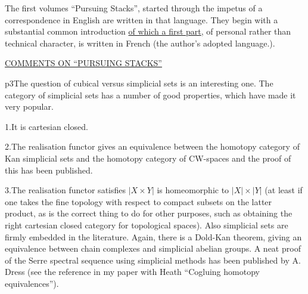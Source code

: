 The  first  volumes ``Pursuing Stacks'', started\textendash{} through the impetus of a correspondence in English are written in that language. They begin with a substantial common introduction \uline{of which a first part}, of personal rather than technical character, is written in French (the author's adopted language.).

\begin{center}\uline{COMMENTS ON ``PURSUING STACKS''}\end{center}


p3\qquad The question of cubical versus simplicial sets is an interesting one. The category of simplicial sets has a number of good properties, which have made it very popular.

1.\quad It is cartesian closed.

2.\quad The realisation functor gives an equivalence between the homotopy category of Kan simplicial sets and the homotopy category of CW-spaces and the proof of this has been published.

3.\quad The realisation functor satisfies $\lvert X\times Y\rvert$ is homeomorphic to $\lvert X\rvert\times\lvert Y\rvert$ (at least if one takes the fine topology with respect to compact subsets on the latter product, as is the correct thing to do for other purposes, such as obtaining the right cartesian closed category for topological spaces). Also simplicial sets are firmly embedded in the literature. Again, there is a Dold-Kan theorem, giving an equivalence between chain complexes and simplicial abelian groups. A neat proof of the Serre spectral sequence using simplicial methods has been published by A. Dress (see the reference in my paper with Heath ``Cogluing homotopy equivalences'').

